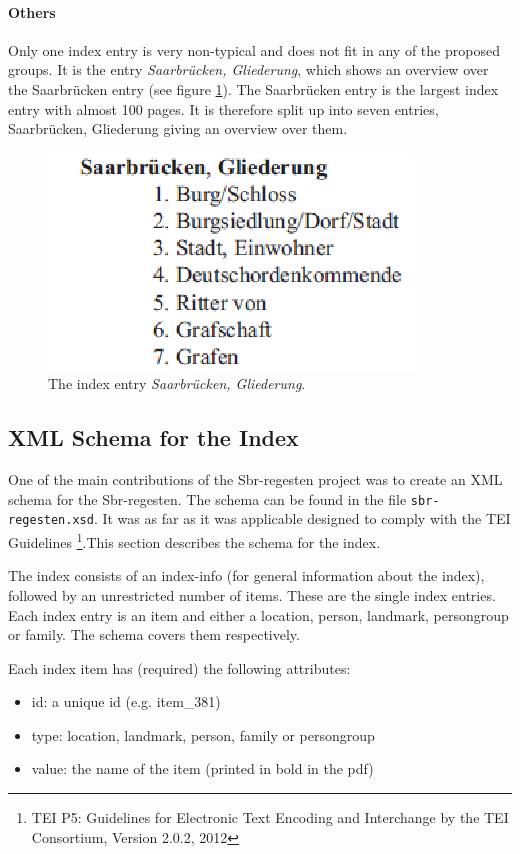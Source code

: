 \paragraph{Others}
Only one index entry is very non-typical and does not fit in any of the proposed groups. It is the entry \textit{Saarbrücken, Gliederung}, which shows an overview over the Saarbrücken entry (see figure \ref{fig:sb-gliederung}). The Saarbrücken entry is the largest index entry with almost 100 pages. It is therefore split up into seven entries, Saarbrücken, Gliederung giving an overview over them.

\begin{figure}[h]
  \centering
  \includegraphics[scale=0.6]{img/sb-gliederung}
  \caption{The index entry \textit{Saarbrücken, Gliederung}.}
  \label{fig:sb-gliederung}
\end{figure}


\subsection{XML Schema for the Index}

One of the main contributions of the Sbr-regesten project was to create an XML schema for the Sbr-regesten. The schema can be found in the file \texttt{sbr-regesten.xsd}.
It was as far as it was applicable designed to comply with the TEI Guidelines \footnote{TEI P5: Guidelines for Electronic Text Encoding and Interchange by the TEI Consortium, Version 2.0.2, 2012}.This section describes the schema for the index.

The index consists of an index-info (for general information about the index), followed by an unrestricted number of items. These are the single index entries.
Each index entry is an item and either a location, person, landmark, persongroup or family. The schema covers them respectively.

Each index item has (required) the following attributes: 
\begin{itemize}
\item id: a unique id (e.g. item\_381)
\item type: location, landmark, person, family or persongroup
\item value: the name of the item (printed in bold in the pdf)
\end{itemize}

